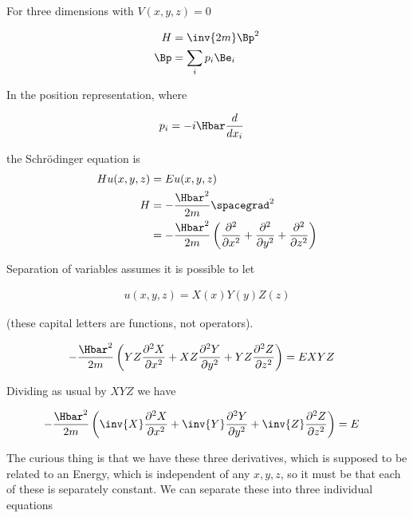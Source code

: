 %
%
For three dimensions with $V(x,y,z) = 0$

\begin{align*}
H &= \inv{2m} \Bp^2 \\
\Bp &= \sum_i p_i \Be_i \\
\end{align*}

In the position representation, where

\begin{align*}
p_i &= -i \Hbar \frac{d}{dx_i}
\end{align*}

the Schr\"{o}dinger equation is
\begin{align*}
H u(x,y,z) &= E u(x,y,z) \\
H &= -\frac{\Hbar^2}{2m} \spacegrad^2 \\
&= -\frac{\Hbar^2}{2m} \left(
\frac{\partial^2}{\partial {x}^2}
+\frac{\partial^2}{\partial {y}^2}
+\frac{\partial^2}{\partial {z}^2}
\right)
\end{align*}

Separation of variables assumes it is possible to let

\begin{align*}
u(x,y,z) = X(x) Y(y) Z(z)
\end{align*}

(these capital letters are functions, not operators).

\begin{align*}
-\frac{\Hbar^2}{2m} \left(
YZ \frac{\partial^2 X}{\partial {x}^2}
+ XZ \frac{\partial^2 Y}{\partial {y}^2}
+ YZ \frac{\partial^2 Z}{\partial {z}^2}\right)
&= E X Y Z
\end{align*}

Dividing as usual by $XYZ$ we have

\begin{align*}
-\frac{\Hbar^2}{2m} \left(
\inv{X} \frac{\partial^2 X}{\partial {x}^2}
+ \inv{Y} \frac{\partial^2 Y}{\partial {y}^2}
+ \inv{Z} \frac{\partial^2 Z}{\partial {z}^2} \right)
&= E
\end{align*}

The curious thing is that we have these three derivatives, which is supposed to be related to an Energy, which is independent of any $x,y,z$, so it must be that each of these is separately constant.  We can separate these into three individual equations

